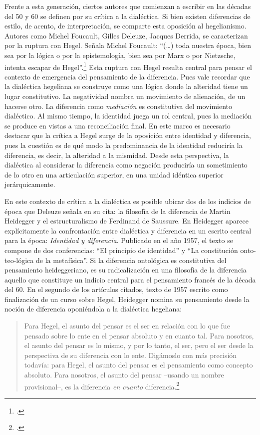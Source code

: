 Frente a esta generación, ciertos autores que comienzan a escribir en
las décadas del 50 y 60 se definen por su crítica a la dialéctica. Si
bien existen diferencias de estilo, de acento, de interpretación, se
comparte esta oposición al hegelianismo. Autores como Michel Foucault,
Gilles Deleuze, Jacques Derrida, se caracterizan por la ruptura con
Hegel. Señala Michel Foucault: \enquote{(\dots) toda nuestra época, bien
sea por la lógica o por la epistemología, bien sea por Marx o por
Nietzsche, intenta escapar de Hegel}.\footcite[59]{foucault1973} Esta ruptura
con Hegel resulta central para pensar el contexto de emergencia del
pensamiento de la diferencia. Pues vale recordar que la dialéctica
hegeliana se construye como una lógica donde la alteridad tiene un lugar
constitutivo. La negatividad nombra un movimiento de alienación, de un
hacerse otro. La diferencia como \emph{mediación} es constitutiva del
movimiento dialéctico. Al mismo tiempo, la identidad juega un rol
central, pues la mediación se produce en vistas a una reconciliación
final. En este marco es necesario destacar que la crítica a Hegel surge
de la oposición entre identidad y diferencia, pues la cuestión es de qué
modo la predominancia de la identidad reduciría la diferencia, es decir,
la alteridad a la mismidad. Desde esta perspectiva, la dialéctica al
considerar la diferencia como negación produciría un sometimiento de lo
otro en una articulación superior, en una unidad idéntica superior
jerárquicamente.

En este contexto de crítica a la dialéctica es posible ubicar dos de los
indicios de época que Deleuze señala en su cita: la filosofía de la
diferencia de Martin Heidegger y el estructuralismo de Ferdinand de
Saussure. En Heidegger aparece explícitamente la confrontación entre
dialéctica y diferencia en un escrito central para la época:
\emph{Identidad y diferencia}. Publicado en el año 1957, el texto se
compone de dos conferencias: \enquote{El principio de identidad} y \enquote{La
constitución onto-teo-lógica de la metafísica}. Si la diferencia
ontológica es constitutiva del pensamiento heideggeriano, es su
radicalización en una filosofía de la diferencia aquello que constituye
un indicio central para el pensamiento francés de la década del 60. En
el segundo de los artículos citados, texto de 1957 escrito como
finalización de un curso sobre Hegel, Heidegger nomina su pensamiento
desde la noción de diferencia oponiéndola a la dialéctica hegeliana:

\begin{quote}
Para Hegel, el asunto del pensar es el ser en relación con lo que fue
pensado sobre lo ente en el pensar absoluto y en cuanto tal. Para
nosotros, el asunto del pensar es lo mismo, y por lo tanto, el ser, pero
el ser desde la perspectiva de su diferencia con lo ente. Digámoslo con
más precisión todavía: para Hegel, el asunto del pensar es el
pensamiento como concepto absoluto. Para nosotros, el asunto del pensar
--usando un nombre provisional--, es la diferencia \emph{en cuanto}
diferencia.\footcite[107]{heidegger1988}
\end{quote}

